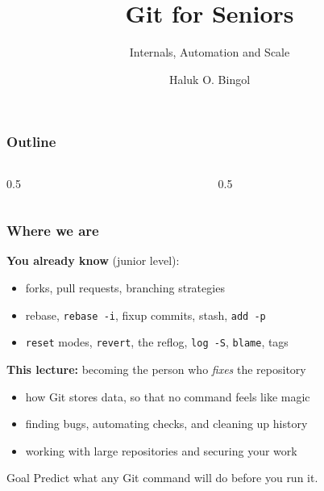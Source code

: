 \documentclass[aspectratio=169,10pt,compress]{beamer}
\title{Git for Seniors}
\subtitle{Internals, Automation and Scale}
\author[Bingol]{Haluk O. Bingol}
\institute[FCIS]{
    Faculty of Computer and Information Sciences\\
    Yeditepe University
}
\date{}
\newcommand{\cmd}[1]{\texttt{\color{gitred}#1}}
\begin{document}
\begin{frame}[t,fragile]
  \titlepage
\end{frame}

\begin{frame}[t,fragile] \frametitle{Outline}
  \begin{columns}[T]
    \begin{column}{0.5\textwidth}
      \tableofcontents[sections={1-6}]
    \end{column}
    \begin{column}{0.5\textwidth}
      \tableofcontents[sections={7-12}]
    \end{column}
  \end{columns}
\end{frame}

\begin{frame}[t,fragile] \frametitle{Where we are}
  \textbf{You already know} (junior level):
  \begin{itemize}
    \item forks, pull requests, branching strategies
    \item rebase, \cmd{rebase -i}, fixup commits, stash, \cmd{add -p}
    \item \cmd{reset} modes, \cmd{revert}, the reflog, \cmd{log -S}, \cmd{blame}, tags
  \end{itemize}

  \vspace{0.5em}
  \textbf{This lecture:} becoming the person who \emph{fixes} the repository
  \begin{itemize}
    \item how Git stores data, so that no command feels like magic
    \item finding bugs, automating checks, and cleaning up history
    \item working with large repositories and securing your work
  \end{itemize}

  \vspace{0.5em}
  \begin{block}{Goal}
    Predict what any Git command will do before you run it.
  \end{block}
\end{frame}
\end{document}
